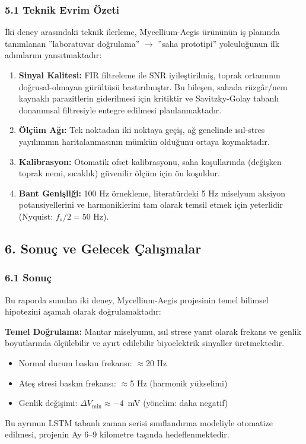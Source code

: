 \documentclass[11pt,a4paper]{article}
\begin{document}
\subsubsection*{5.1 Teknik Evrim Özeti}

İki deney arasındaki teknik ilerleme, Mycellium-Aegis ürününün iş planında tanımlanan ''laboratuvar doğrulama'' $\rightarrow$ ''saha prototipi'' yolculuğunun ilk adımlarını yansıtmaktadır:
\begin{enumerate}[leftmargin=1.2cm]
  \item \textbf{Sinyal Kalitesi:} FIR filtreleme ile SNR iyileştirilmiş, toprak ortamının doğrusal-olmayan gürültüsü bastırılmıştır. Bu bileşen, sahada rüzgâr/nem kaynaklı parazitlerin giderilmesi için kritiktir ve Savitzky-Golay tabanlı donanımsal filtresiyle entegre edilmesi planlanmaktadır.
  \item \textbf{Ölçüm Ağı:} Tek noktadan iki noktaya geçiş, ağ genelinde ısıl-stres yayılımının haritalanmasının mümkün olduğunu ortaya koymaktadır.
  \item \textbf{Kalibrasyon:} Otomatik ofset kalibrasyonu, saha koşullarında (değişken toprak nemi, sıcaklık) güvenilir ölçüm için ön koşuldur.
  \item \textbf{Bant Genişliği:} 100 Hz örnekleme, literatürdeki 5 Hz miselyum aksiyon potansiyellerini ve harmoniklerini tam olarak temsil etmek için yeterlidir (Nyquist: $f_s/2 = 50$ Hz).
\end{enumerate}

\subsection*{6. Sonuç ve Gelecek Çalışmalar}

\subsubsection*{6.1 Sonuç}

Bu raporda sunulan iki deney, Mycellium-Aegis projesinin temel bilimsel hipotezini aşamalı olarak doğrulamaktadır:

\textbf{Temel Doğrulama:} Mantar miselyumu, ısıl strese yanıt olarak frekans ve genlik boyutlarında ölçülebilir ve ayırt edilebilir biyoelektrik sinyaller üretmektedir.
\begin{itemize}[leftmargin=1cm]
  \item Normal durum baskın frekansı: $\approx$20 Hz
  \item Ateş stresi baskın frekansı: $\approx$5 Hz (harmonik yükselimi)
  \item Genlik değişimi: $\Delta V_{\min} \approx -4$~mV (yönelim: daha negatif)
\end{itemize}
Bu ayrımın LSTM tabanlı zaman serisi sınıflandırma modeliyle otomatize edilmesi, projenin Ay 6--9 kilometre taşında hedeflenmektedir.
\end{document}
